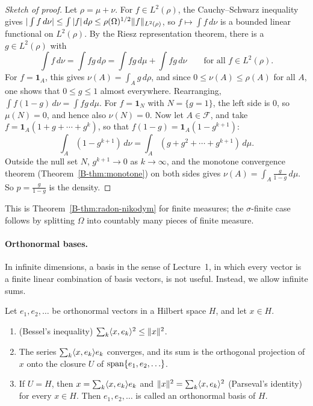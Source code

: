 \begin{proof}[Sketch of proof]
    Let $\rho = \mu + \nu$. For $f \in L^2(\rho)$, the Cauchy--Schwarz inequality gives $|\int f\, d\nu| \leq \int |f|\, d\rho \leq \rho(\Omega)^{1/2}\lVert f \rVert_{L^2(\rho)}$, so $f \mapsto \int f\, d\nu$ is a bounded linear functional on $L^2(\rho)$. By the Riesz representation theorem, there is a $g \in L^2(\rho)$ with
    \[\int f\, d\nu = \int fg\, d\rho = \int fg\, d\mu + \int fg\, d\nu \qquad \text{for all } f \in L^2(\rho).\]
    For $f = \mathbf{1}_A$, this gives $\nu(A) = \int_A g\, d\rho$, and since $0 \leq \nu(A) \leq \rho(A)$ for all $A$, one shows that $0 \leq g \leq 1$ almost everywhere. Rearranging, $\int f(1 - g)\, d\nu = \int fg\, d\mu$. For $f = \mathbf{1}_N$ with $N = \{g = 1\}$, the left side is $0$, so $\mu(N) = 0$, and hence also $\nu(N) = 0$. Now let $A \in \mathcal{F}$, and take $f = \mathbf{1}_A(1 + g + \cdots + g^k)$, so that $f(1 - g) = \mathbf{1}_A(1 - g^{k+1})$:
    \[\int_A (1 - g^{k+1})\, d\nu = \int_A (g + g^2 + \cdots + g^{k+1})\, d\mu.\]
    Outside the null set $N$, $g^{k+1} \to 0$ as $k \to \infty$, and the monotone convergence theorem (Theorem~\ref{B-thm:monotone}) on both sides gives $\nu(A) = \int_A \frac{g}{1 - g}\, d\mu$. So $p = \frac{g}{1 - g}$ is the density.
\end{proof}

This is Theorem~\ref{B-thm:radon-nikodym} for finite measures; the $\sigma$-finite case follows by splitting $\Omega$ into countably many pieces of finite measure.

\paragraph{Orthonormal bases.} In infinite dimensions, a basis in the sense of Lecture~1, in which every vector is a finite linear combination of basis vectors, is not useful. Instead, we allow infinite sums.

\begin{theorem}\label{A-thm:onb}
    Let $e_1, e_2, \ldots$ be orthonormal vectors in a Hilbert space $H$, and let $x \in H$.
    \begin{enumerate}
        \item (Bessel's inequality) $\sum_k \langle x, e_k \rangle^2 \leq \lVert x \rVert^2$.
        \item The series $\sum_k \langle x, e_k \rangle e_k$ converges, and its sum is the orthogonal projection of $x$ onto the closure $U$ of $\operatorname{span}\{e_1, e_2, \ldots\}$.
        \item If $U = H$, then $x = \sum_k \langle x, e_k \rangle e_k$ and $\lVert x \rVert^2 = \sum_k \langle x, e_k \rangle^2$ (Parseval's identity) for every $x \in H$. Then $e_1, e_2, \ldots$ is called an orthonormal basis of $H$.
    \end{enumerate}
\end{theorem}

